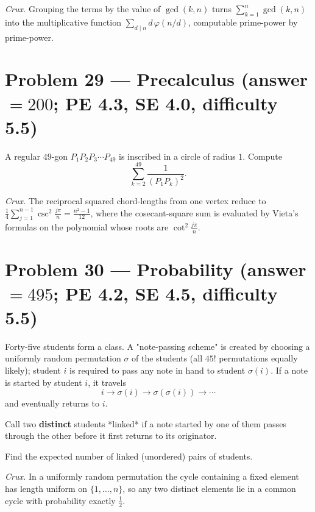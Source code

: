\documentclass[11pt]{article}
\begin{document}
\medskip

\textit{Crux.} Grouping the terms by the value of $\gcd(k,n)$ turns $\sum_{k=1}^n\gcd(k,n)$ into the multiplicative function $\sum_{d\mid n} d\,\varphi(n/d)$, computable prime-power by prime-power.

\section*{Problem 29 --- Precalculus \quad (answer $=200$; PE 4.3, SE 4.0, difficulty 5.5)}

A regular $49$-gon $P_1P_2P_3\cdots P_{49}$ is inscribed in a circle of radius $1$. Compute
$$\sum_{k=2}^{49}\frac{1}{(P_1P_k)^2}.$$

\medskip

\textit{Crux.} The reciprocal squared chord-lengths from one vertex reduce to $\tfrac14\sum_{j=1}^{n-1}\csc^2\frac{j\pi}{n}=\tfrac{n^2-1}{12}$, where the cosecant-square sum is evaluated by Vieta's formulas on the polynomial whose roots are $\cot^2\frac{j\pi}{n}$.

\section*{Problem 30 --- Probability \quad (answer $=495$; PE 4.2, SE 4.5, difficulty 5.5)}

Forty-five students form a class. A "note-passing scheme" is created by choosing a uniformly random permutation $\sigma$ of the students (all $45!$ permutations equally likely); student $i$ is required to pass any note in hand to student $\sigma(i)$. If a note is started by student $i$, it travels
$$i \to \sigma(i) \to \sigma(\sigma(i)) \to \cdots$$
and eventually returns to $i$.

Call two \textbf{distinct} students *linked* if a note started by one of them passes through the other before it first returns to its originator.

Find the expected number of linked (unordered) pairs of students.

\medskip

\textit{Crux.} In a uniformly random permutation the cycle containing a fixed element has length uniform on $\{1,\dots,n\}$, so any two distinct elements lie in a common cycle with probability exactly $\tfrac12$.
\end{document}
